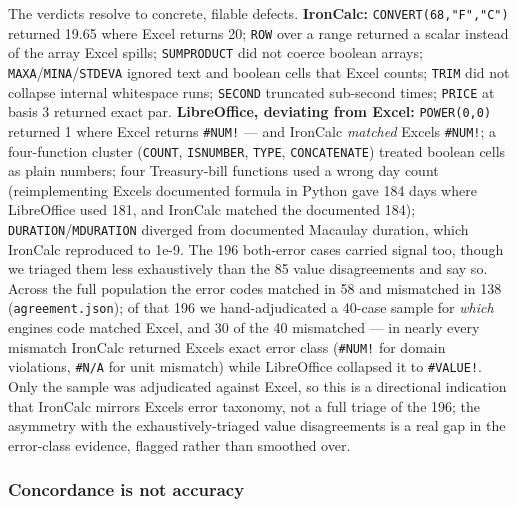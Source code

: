 \documentclass[
]{article}
\begin{document}
The verdicts resolve to concrete, filable defects. \textbf{IronCalc:}
\texttt{CONVERT(68,"F","C")} returned 19.65 where Excel returns 20;
\texttt{ROW} over a range returned a scalar instead of the array Excel
spills; \texttt{SUMPRODUCT} did not coerce boolean arrays;
\texttt{MAXA}/\texttt{MINA}/\texttt{STDEVA} ignored text and boolean
cells that Excel counts; \texttt{TRIM} did not collapse internal
whitespace runs; \texttt{SECOND} truncated sub-second times;
\texttt{PRICE} at basis 3 returned exact par. \textbf{LibreOffice,
deviating from Excel:} \texttt{POWER(0,0)} returned 1 where Excel
returns \texttt{\#NUM!} --- and IronCalc \emph{matched}
Excel\textquotesingle s \texttt{\#NUM!}; a four-function cluster
(\texttt{COUNT}, \texttt{ISNUMBER}, \texttt{TYPE}, \texttt{CONCATENATE})
treated boolean cells as plain numbers; four Treasury-bill functions
used a wrong day count (reimplementing Excel\textquotesingle s
documented formula in Python gave 184 days where LibreOffice used 181,
and IronCalc matched the documented 184);
\texttt{DURATION}/\texttt{MDURATION} diverged from documented Macaulay
duration, which IronCalc reproduced to 1e-9. The 196 both-error cases
carried signal too, though we triaged them less exhaustively than the 85
value disagreements and say so. Across the full population the error
codes matched in 58 and mismatched in 138 (\texttt{agreement.json}); of
that 196 we hand-adjudicated a 40-case sample for \emph{which}
engine\textquotesingle s code matched Excel, and 30 of the 40 mismatched
--- in nearly every mismatch IronCalc returned Excel\textquotesingle s
exact error class (\texttt{\#NUM!} for domain violations, \texttt{\#N/A}
for unit mismatch) while LibreOffice collapsed it to \texttt{\#VALUE!}.
Only the sample was adjudicated against Excel, so this is a directional
indication that IronCalc mirrors Excel\textquotesingle s error taxonomy,
not a full triage of the 196; the asymmetry with the
exhaustively-triaged value disagreements is a real gap in the
error-class evidence, flagged rather than smoothed over.

\subsubsection{Concordance is not
accuracy}\label{concordance-is-not-accuracy}
\end{document}
